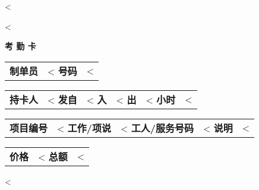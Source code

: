 <%


\begin{CJK}{UTF8}{arialuni}

\vspace*{-3.3cm}
<%
\vspace*{1.5cm}

\centerline{\textbf{考 勤 卡}}

\vspace*{0.5cm}

\begin{tabular}[t]{ll}
  \textbf{制单员} & <%
  \textbf{号码} & <%
\end{tabular}
\hfill
\begin{tabular}[t]{ll}
  \textbf{持卡人} & <%
  \textbf{发自} & <%
  \textbf{入} & <%
  \textbf{出} & <%
  \textbf{小时} & <%
\end{tabular}

\vspace{1cm}

\begin{tabular}[b]{ll}
  \textbf{项目编号} & <%
  \textbf{工作/项说} & <%
  \textbf{工人/服务号码} & <%
  \textbf{说明} & <%
\end{tabular}
\hfill
\begin{tabular}[b]{lr}
  \textbf{价格} & <%
  \textbf{总额} & <%
\end{tabular}
  
\vspace{0.3cm}

<%

\vfill

\end{CJK} 



